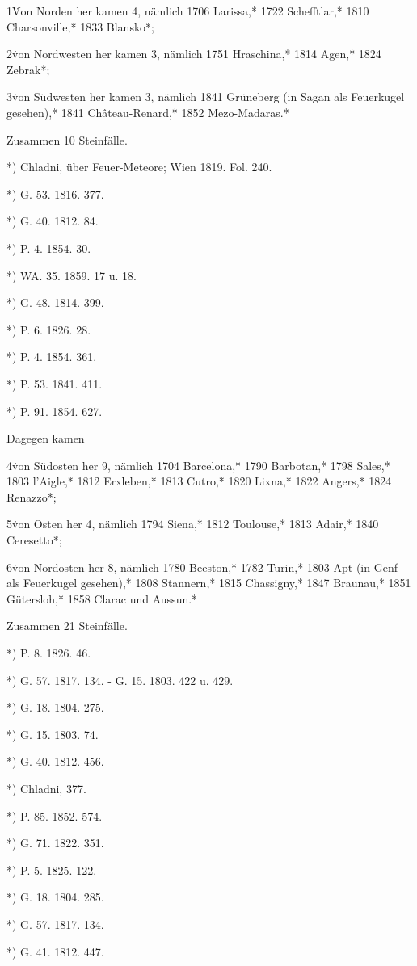 \documentclass[a4paper, 11pt, oneside, polutonikogreek, german]{article}
\begin{document}
1\. Von Norden her kamen 4, nämlich 1706 Larissa,* 1722 Schefftlar,* 1810 Charsonville,* 1833 Blansko*;

2\. von Nordwesten her kamen 3, nämlich 1751 Hraschina,* 1814 Agen,* 1824 Zebrak*;

3\. von Südwesten her kamen 3, nämlich 1841 Grüneberg (in Sagan als Feuerkugel gesehen),* 1841 Château-Renard,* 1852 Mezo-Madaras.*

Zusammen 10 Steinfälle.

*) Chladni, über Feuer-Meteore; Wien 1819. Fol. 240.

*) G. 53. 1816. 377.

*) G. 40. 1812. 84.

*) P. 4. 1854. 30.

*) WA. 35. 1859. 17 u. 18.

*) G. 48. 1814. 399.

*) P. 6. 1826. 28.

*) P. 4. 1854. 361.

*) P. 53. 1841. 411.

*) P. 91. 1854. 627.

Dagegen kamen

4\. von Südosten her 9, nämlich 1704 Barcelona,* 1790 Barbotan,* 1798 Sales,* 1803 l'Aigle,* 1812 Erxleben,* 1813 Cutro,* 1820 Lixna,* 1822 Angers,* 1824 Renazzo*;

5\. von Osten her 4, nämlich 1794 Siena,* 1812 Toulouse,* 1813 Adair,* 1840 Ceresetto*;

6\. von Nordosten her 8, nämlich 1780 Beeston,* 1782 Turin,* 1803 Apt (in Genf als Feuerkugel gesehen),* 1808 Stannern,* 1815 Chassigny,* 1847 Braunau,* 1851 Gütersloh,* 1858 Clarac und Aussun.*

Zusammen 21 Steinfälle.

*) P. 8. 1826. 46.

*) G. 57. 1817. 134. - G. 15. 1803. 422 u. 429.

*) G. 18. 1804. 275.

*) G. 15. 1803. 74.

*) G. 40. 1812. 456.

*) Chladni, 377.

*) P. 85. 1852. 574.

*) G. 71. 1822. 351.

*) P. 5. 1825. 122.

*) G. 18. 1804. 285.

*) G. 57. 1817. 134.

*) G. 41. 1812. 447.
\end{document}
